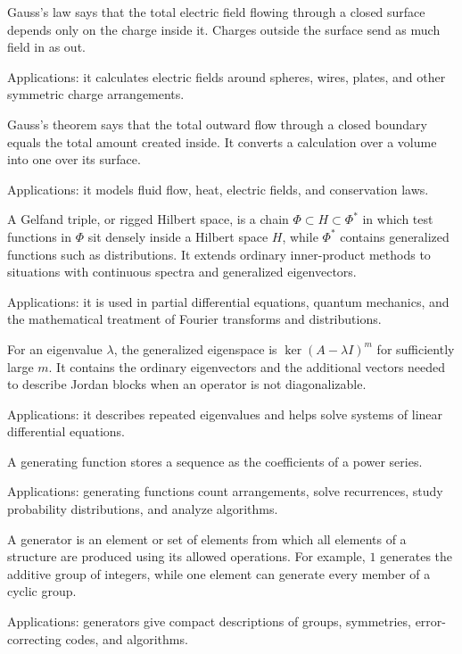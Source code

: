 Gauss's law says that the total electric field flowing through a closed surface depends only on the charge inside it. Charges outside the surface send as much field in as out. \par\noindent Applications: it calculates electric fields around spheres, wires, plates, and other symmetric charge arrangements.

Gauss's theorem says that the total outward flow through a closed boundary equals the total amount created inside. It converts a calculation over a volume into one over its surface. \par\noindent Applications: it models fluid flow, heat, electric fields, and conservation laws.

A Gelfand triple, or rigged Hilbert space, is a chain $\Phi\subset H\subset\Phi^*$ in which test functions in $\Phi$ sit densely inside a Hilbert space $H$, while $\Phi^*$ contains generalized functions such as distributions. It extends ordinary inner-product methods to situations with continuous spectra and generalized eigenvectors. \par\noindent Applications: it is used in partial differential equations, quantum mechanics, and the mathematical treatment of Fourier transforms and distributions.

For an eigenvalue $\lambda$, the generalized eigenspace is $\ker(A-\lambda I)^m$ for sufficiently large $m$. It contains the ordinary eigenvectors and the additional vectors needed to describe Jordan blocks when an operator is not diagonalizable. \par\noindent Applications: it describes repeated eigenvalues and helps solve systems of linear differential equations.

A generating function stores a sequence as the coefficients of a power series.  \par\noindent Applications: generating functions count arrangements, solve recurrences, study probability distributions, and analyze algorithms.

A generator is an element or set of elements from which all elements of a structure are produced using its allowed operations. For example, $1$ generates the additive group of integers, while one element can generate every member of a cyclic group. \par\noindent Applications: generators give compact descriptions of groups, symmetries, error-correcting codes, and algorithms.

